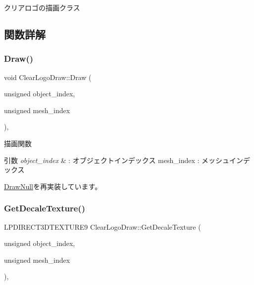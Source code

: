 クリアロゴの描画クラス 

\subsection{関数詳解}
\mbox{\label{class_clear_logo_draw_ab018f370071f370ae7016d8ee402c456}} 
\subsubsection{\texorpdfstring{Draw()}{Draw()}}
{\footnotesize\ttfamily void Clear\+Logo\+Draw\+::\+Draw (\begin{DoxyParamCaption}\item[{unsigned}]{object\+\_\+index,  }\item[{unsigned}]{mesh\+\_\+index }\end{DoxyParamCaption})\hspace{0.3cm}{\ttfamily [override]}, {\ttfamily [virtual]}}



描画関数 


\begin{DoxyParams}{引数}
{\em object\+\_\+index} & \+: オブジェクトインデックス mesh\+\_\+index \+: メッシュインデックス \\
\hline
\end{DoxyParams}


\mbox{\hyperlink{class_draw_null_afe50f6fd820b18d673f70f048743f339}{Draw\+Null}}を再実装しています。

\mbox{\label{class_clear_logo_draw_a04ae25ae9cb59df0d0c346b65baed3f2}} 
\subsubsection{\texorpdfstring{Get\+Decale\+Texture()}{GetDecaleTexture()}}
{\footnotesize\ttfamily L\+P\+D\+I\+R\+E\+C\+T3\+D\+T\+E\+X\+T\+U\+R\+E9 Clear\+Logo\+Draw\+::\+Get\+Decale\+Texture (\begin{DoxyParamCaption}\item[{unsigned}]{object\+\_\+index,  }\item[{unsigned}]{mesh\+\_\+index }\end{DoxyParamCaption})\hspace{0.3cm}{\ttfamily [override]}, {\ttfamily [virtual]}}



